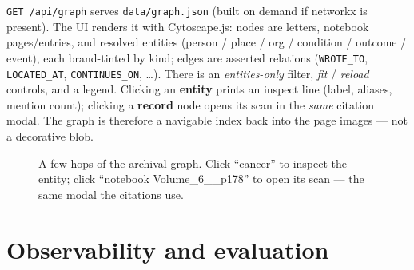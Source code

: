 \documentclass[11pt]{article}
\newcommand{\code}[1]{\texttt{#1}}
\begin{document}
\code{GET /api/graph} serves \code{data/graph.json} (built on demand if networkx
is present). The UI renders it with Cytoscape.js: nodes are letters, notebook
pages/entries, and resolved entities (person / place / org / condition / outcome
/ event), each brand-tinted by kind; edges are asserted relations
(\code{WROTE\_TO}, \code{LOCATED\_AT}, \code{CONTINUES\_ON}, \dots). There is an
\emph{entities-only} filter, \emph{fit} / \emph{reload} controls, and a legend.
Clicking an \textbf{entity} prints an inspect line (label, aliases, mention
count); clicking a \textbf{record} node opens its scan in the \emph{same}
citation modal. The graph is therefore a navigable index back into the page
images --- not a decorative blob.

\begin{figure}[h]
\centering
{}
\caption{A few hops of the archival graph. Click ``cancer'' to inspect the
entity; click ``notebook Volume\_6\_\_p178'' to open its scan --- the same modal
the citations use.}
\end{figure}

\FloatBarrier

\section{Observability and evaluation}
\end{document}
